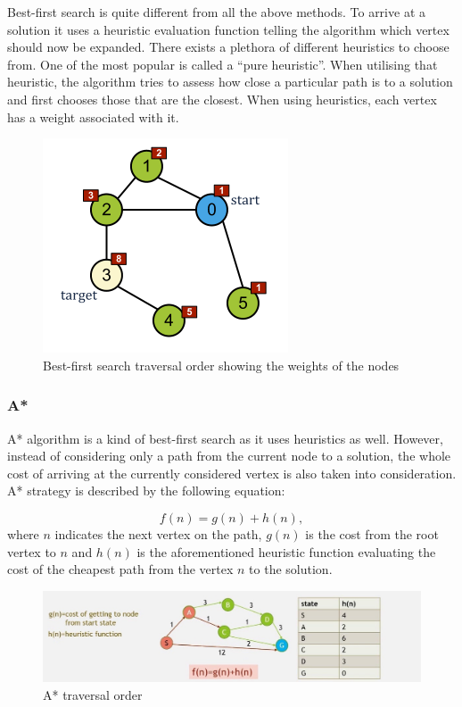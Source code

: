 \documentclass[12pt]{article}
\begin{document}
Best-first search is quite different from all the above methods. To arrive at a solution it uses a heuristic evaluation function telling the algorithm which vertex should now be expanded. There exists a plethora of different heuristics to choose from. One of the most popular is called a ``pure heuristic''. When utilising that heuristic, the algorithm tries to assess how close a particular path is to a solution and first chooses those that are the closest. When using heuristics, each vertex has a weight associated with it.

\begin{figure}[h]
    \includegraphics[scale=0.75]{bfs2}
    \centering
    \caption{Best-first search traversal order showing the weights of the nodes \cite{bfs2_image}}
\end{figure}

\subsubsection{A*}

A* algorithm is a kind of best-first search as it uses heuristics as well. However, instead of considering only a path from the current node to a solution, the whole cost of arriving at the currently considered vertex is also taken into consideration. A* strategy is described by the following equation:

\[
f(n) = g(n) + h(n),
\]
where $n$ indicates the next vertex on the path, $g(n)$ is the cost from the root vertex to $n$ and $h(n)$ is the aforementioned heuristic function evaluating the cost of the cheapest path from the vertex $n$ to the solution.

\begin{figure}[h]
    \includegraphics[width=\textwidth]{astar}
    \centering
    \caption{A* traversal order \cite{astar_image}}
\end{figure}
\end{document}
